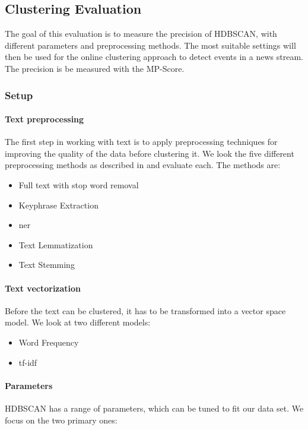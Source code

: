 \subsection{Clustering Evaluation}
\label{subsec:5a_clustering_evaluation}

The goal of this evaluation is to measure the precision of HDBSCAN, with different parameters and preprocessing methods.
The most suitable settings will then be used for the online clustering approach to detect events in a news stream.
The precision is be measured with the MP-Score.

\subsubsection{Setup}
\label{subsubsec:5a_setup}

\paragraph{Text preprocessing}
The first step in working with text is to apply preprocessing techniques for improving the quality of the data before clustering it.
We look the five different preprocessing methods as described in  and evaluate each.
The methods are:

\begin{itemize}
    \item Full text with stop word removal
    \item Keyphrase Extraction
    \item \Gls{ner}
    \item Text Lemmatization
    \item Text Stemming
\end{itemize}

\paragraph{Text vectorization}
Before the text can be clustered, it has to be transformed into a vector space model.
We look at two different models:

\begin{itemize}
    \item Word Frequency
    \item tf-idf
\end{itemize}

\paragraph{Parameters}
HDBSCAN has a range of parameters, which can be tuned to fit our data set.
We focus on the two primary ones:

